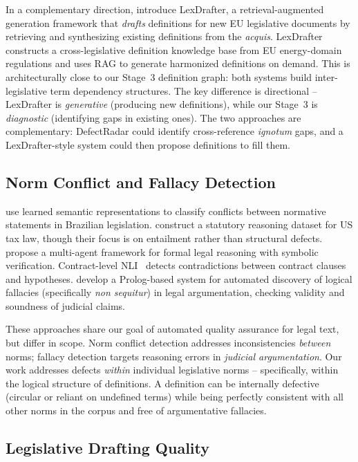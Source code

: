 \documentclass[11pt]{article}
\begin{document}
In a complementary direction, \citet{chouhan2024lexdrafter} introduce LexDrafter, a retrieval-augmented generation framework that \emph{drafts} definitions for new EU legislative documents by retrieving and synthesizing existing definitions from the \emph{acquis}.
LexDrafter constructs a cross-legislative definition knowledge base from EU energy-domain regulations and uses RAG to generate harmonized definitions on demand.
This is architecturally close to our Stage~3 definition graph: both systems build inter-legislative term dependency structures.
The key difference is directional -- LexDrafter is \emph{generative} (producing new definitions), while our Stage~3 is \emph{diagnostic} (identifying gaps in existing ones).
The two approaches are complementary: DefectRadar could identify cross-reference \emph{ignotum} gaps, and a LexDrafter-style system could then propose definitions to fill them.

\subsection{Norm Conflict and Fallacy Detection}

\citet{aires2019classifying} use learned semantic representations to classify conflicts between normative statements in Brazilian legislation.
\citet{holzenberger2020statutory} construct a statutory reasoning dataset for US tax law, though their focus is on entailment rather than structural defects.
\citet{sadowski2025verifiable} propose a multi-agent framework for formal legal reasoning with symbolic verification.
Contract-level NLI~\citep{koreeda2021contractnli} detects contradictions between contract clauses and hypotheses.
\citet{nakpih2020fallacies} develop a Prolog-based system for automated discovery of logical fallacies (specifically \emph{non sequitur}) in legal argumentation, checking validity and soundness of judicial claims.

These approaches share our goal of automated quality assurance for legal text, but differ in scope.
Norm conflict detection addresses inconsistencies \emph{between} norms; fallacy detection targets reasoning errors in \emph{judicial argumentation}.
Our work addresses defects \emph{within} individual legislative norms -- specifically, within the logical structure of definitions.
A definition can be internally defective (circular or reliant on undefined terms) while being perfectly consistent with all other norms in the corpus and free of argumentative fallacies.

\subsection{Legislative Drafting Quality}
\end{document}
